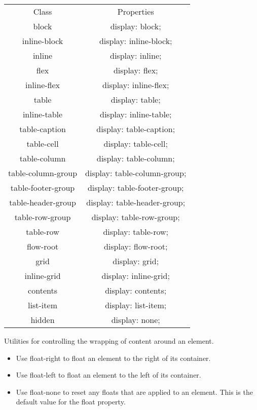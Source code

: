 \documentclass{report}
\begin{document}
    \pagebreak 
    \bigbreak \noindent 
    \begin{center}
        \begin{tabular}{c|c}
            Class &Properties \\
            block	&display: block;\\
            inline-block	&display: inline-block;\\
            inline	&display: inline;\\
            flex	&display: flex;\\
            inline-flex	&display: inline-flex;\\
            table	&display: table;\\
            inline-table	&display: inline-table;\\
            table-caption	&display: table-caption;\\
            table-cell	&display: table-cell;\\
            table-column	&display: table-column;\\
            table-column-group	&display: table-column-group;\\
            table-footer-group	&display: table-footer-group;\\
            table-header-group	&display: table-header-group;\\
            table-row-group	&display: table-row-group;\\
            table-row	&display: table-row;\\
            flow-root	&display: flow-root;\\
            grid	&display: grid;\\
            inline-grid	&display: inline-grid;\\
            contents	&display: contents;\\
            list-item	&display: list-item;\\
            hidden	&display: none;
        \end{tabular}
    \end{center}

    \pagebreak 
    \bigbreak \noindent 
    Utilities for controlling the wrapping of content around an element.
    \bigbreak \noindent 
    \begin{itemize}
        \item Use float-right to float an element to the right of its container.
        \item Use float-left to float an element to the left of its container.
        \item Use float-none to reset any floats that are applied to an element. This is the default value for the float property.
    \end{itemize}
\end{document}

